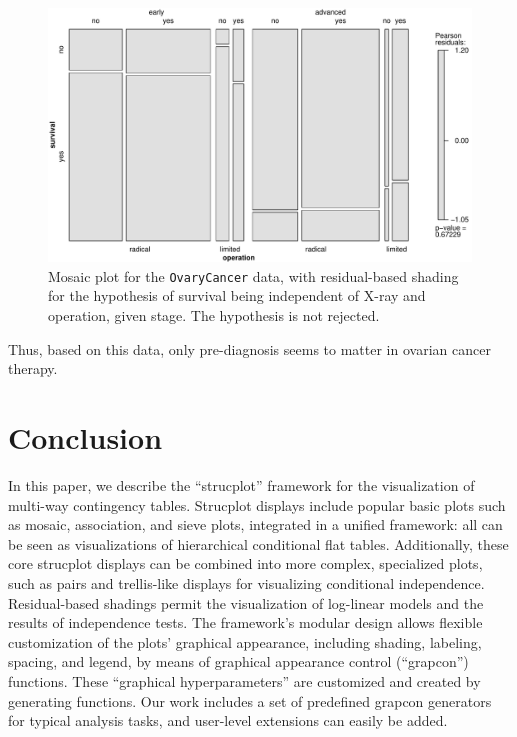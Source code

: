 \documentclass{Z}
\newcommand{\data}[1]{\texttt{#1}}
\begin{document}
\begin{figure}[p]
\begin{center}
\includegraphics{strucplot-ocmosaicstage}
\caption{Mosaic plot for the \data{OvaryCancer} data, with residual-based shading
for the hypothesis of survival being independent of X-ray and operation, given
stage. The hypothesis is not rejected.}
\label{fig:ocmosaicstage}
\end{center}
\end{figure}

\noindent Thus, based on this data, only pre-diagnosis seems to matter in ovarian
cancer therapy.

\section{Conclusion}
\label{sec:conclusion}

In this paper, we describe the ``strucplot'' framework for the visualization of
multi-way contingency tables. Strucplot displays include popular 
basic plots such as mosaic, association, and sieve plots, integrated 
in a unified framework: all can be seen as visualizations of
hierarchical conditional flat tables. 
Additionally, these core strucplot displays can be combined into more complex, 
specialized plots, such as pairs and trellis-like displays for visualizing
conditional independence. Residual-based shadings permit the
visualization of log-linear models and the results of independence tests.
The framework's modular design allows
flexible customization of the plots' graphical appearance, including 
shading, labeling, spacing, and legend, by means of graphical
appearance control (``grapcon'') functions. These ``graphical
hyperparameters'' are customized and created by
generating functions. Our work includes a set of predefined grapcon generators for
typical analysis tasks, and user-level extensions can easily be added.
\end{document}
